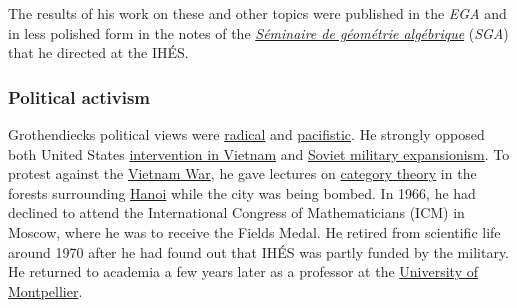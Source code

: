 The results of his work on these and other topics were published in the \emph{EGA} and in less polished form in the notes of the \emph{\href{https://en.wikipedia.org/wiki/Séminaire_de_géométrie_algébrique}{Séminaire de géométrie algébrique}} (\emph{SGA}) that he directed at the IHÉS.


\subsubsection{Political activism}\label{Political_activism}

Grothendieck\textquotesingle s political views were \href{https://en.wikipedia.org/wiki/Political_radicalism}{radical} and \href{https://en.wikipedia.org/wiki/Pacifist}{pacifistic}. He strongly opposed both United States \href{https://en.wikipedia.org/wiki/Vietnam_War}{intervention in Vietnam} and \href{https://en.wikipedia.org/wiki/Soviet_Empire}{Soviet military expansionism}. To protest against the \href{https://en.wikipedia.org/wiki/Vietnam_War}{Vietnam War}, he gave lectures on \href{https://en.wikipedia.org/wiki/Category_theory}{category theory} in the forests surrounding \href{https://en.wikipedia.org/wiki/Hanoi}{Hanoi} while the city was being bombed. In 1966, he had declined to attend the International Congress of Mathematicians (ICM) in Moscow, where he was to receive the Fields Medal. He retired from scientific life around 1970 after he had found out that IHÉS was partly funded by the military. He returned to academia a few years later as a professor at the \href{https://en.wikipedia.org/wiki/University_of_Montpellier}{University of Montpellier}.

